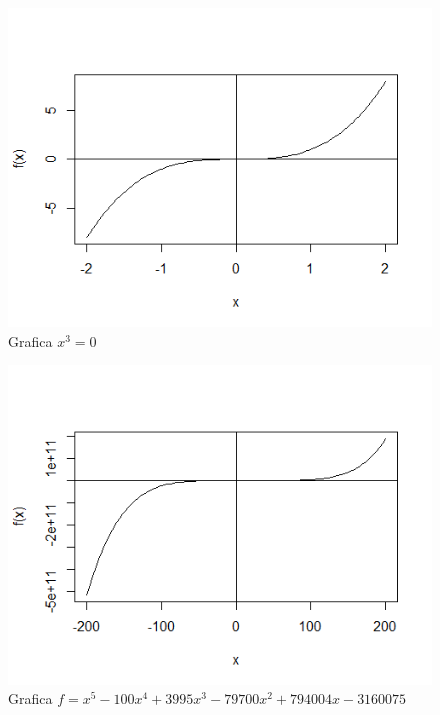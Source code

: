 \documentclass[12pt,a4paper]{article}
\begin{document}
\begin{figure}
	\centering                                         
	\includegraphics[scale = 1.0]{Ec1.png} 
	\caption{Grafica  $x^3=0$}           
\end{figure}

\begin{figure}
	\centering                                         
	\includegraphics[scale = 1.0]{Ec2.png} 
	\caption{Grafica  $f=x^5-100x^4+3995x^3-79700x^2+794004x-3160075$}            
\end{figure}
\end{document}
